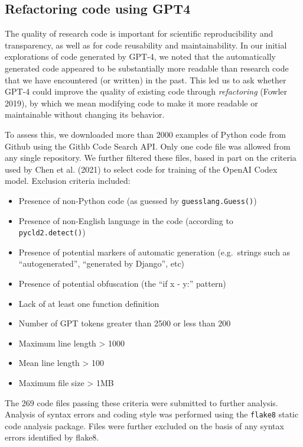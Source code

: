 \documentclass[
]{article}
\providecommand{\tightlist}{%
  \setlength{\itemsep}{0pt}\setlength{\parskip}{0pt}}\usepackage{longtable,booktabs,array}
\begin{document}
\hypertarget{refactoring-code-using-gpt4}{%
\subsection{Refactoring code using
GPT4}\label{refactoring-code-using-gpt4}}

The quality of research code is important for scientific reproducibility
and transparency, as well as for code reusability and maintainability.
In our initial explorations of code generated by GPT-4, we noted that
the automatically generated code appeared to be substantially more
readable than research code that we have encountered (or written) in the
past. This led us to ask whether GPT-4 could improve the quality of
existing code through \emph{refactoring} (Fowler 2019), by which we mean
modifying code to make it more readable or maintainable without changing
its behavior.

To assess this, we downloaded more than 2000 examples of Python code
from Github using the Githb Code Search API. Only one code file was
allowed from any single repository. We further filtered these files,
based in part on the criteria used by Chen et al. (2021) to select code
for training of the OpenAI Codex model. Exclusion criteria included:

\begin{itemize}
\tightlist
\item
  Presence of non-Python code (as guessed by \texttt{guesslang.Guess()})
\item
  Presence of non-English language in the code (according to
  \texttt{pycld2.detect()})
\item
  Presence of potential markers of automatic generation (e.g.~strings
  such as ``autogenerated'', ``generated by Django'', etc)
\item
  Presence of potential obfuscation (the ``if x - y:'' pattern)
\item
  Lack of at least one function definition
\item
  Number of GPT tokens greater than 2500 or less than 200
\item
  Maximum line length \textgreater{} 1000
\item
  Mean line length \textgreater{} 100
\item
  Maximum file size \textgreater{} 1MB
\end{itemize}

The 269 code files passing these criteria were submitted to further
analysis. Analysis of syntax errors and coding style was performed using
the \texttt{flake8} static code analysis package. Files were further
excluded on the basis of any syntax errors identified by flake8.
\end{document}
